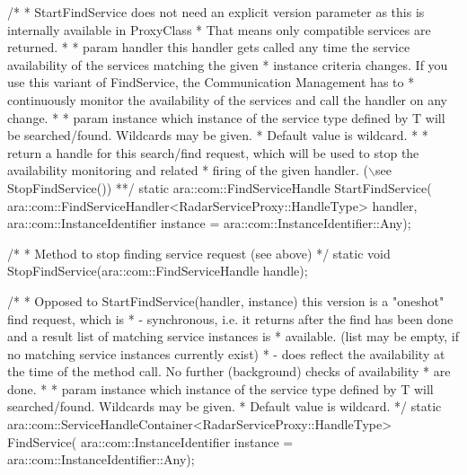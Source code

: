 \begin{DoxyItemize}
\begin{DoxyCode}
  \textcolor{comment}{/*}
\textcolor{comment}{   * StartFindService does not need an explicit version parameter as this}
\textcolor{comment}{     is internally available in ProxyClass}
\textcolor{comment}{   * That means only compatible services are returned.}
\textcolor{comment}{   *}
\textcolor{comment}{   * param handler this handler gets called any time the service}
\textcolor{comment}{     availability of the services matching the given}
\textcolor{comment}{   * instance criteria changes. If you use this variant of FindService,}
\textcolor{comment}{     the Communication Management has to}
\textcolor{comment}{   * continuously monitor the availability of the services and call the}
\textcolor{comment}{     handler on any change.}
\textcolor{comment}{   *}
\textcolor{comment}{   * param instance which instance of the service type defined by T will}
\textcolor{comment}{     be searched/found. Wildcards may be given.}
\textcolor{comment}{   * Default value is wildcard.}
\textcolor{comment}{   *}
\textcolor{comment}{   * return a handle for this search/find request, which will be used to }
\textcolor{comment}{     stop the availability monitoring and related}
\textcolor{comment}{   * firing of the given handler. (\(\backslash\)see StopFindService())}
\textcolor{comment}{   **/}
  \textcolor{keyword}{static} ara::com::FindServiceHandle StartFindService(
  ara::com::FindServiceHandler<RadarServiceProxy::HandleType> handler,
  ara::com::InstanceIdentifier instance =
  ara::com::InstanceIdentifier::Any);

  \textcolor{comment}{/*}
\textcolor{comment}{   * Method to stop finding service request (see above)}
\textcolor{comment}{   */}
  \textcolor{keyword}{static} \textcolor{keywordtype}{void} StopFindService(ara::com::FindServiceHandle handle);

  \textcolor{comment}{/*}
\textcolor{comment}{   * Opposed to StartFindService(handler, instance) this version is a "oneshot"}
\textcolor{comment}{     find request, which is}
\textcolor{comment}{   * - synchronous, i.e. it returns after the find has been done and a}
\textcolor{comment}{    result list of matching service instances is}
\textcolor{comment}{   * available. (list may be empty, if no matching service instances }
\textcolor{comment}{     currently exist)}
\textcolor{comment}{   * - does reflect the availability at the time of the method call. No}
\textcolor{comment}{    further (background) checks of availability}
\textcolor{comment}{   * are done.}
\textcolor{comment}{   *}
\textcolor{comment}{   * param instance which instance of the service type defined by T will}
\textcolor{comment}{     searched/found. Wildcards may be given.}
\textcolor{comment}{   * Default value is wildcard.}
\textcolor{comment}{   */}
  \textcolor{keyword}{static} ara::com::ServiceHandleContainer<RadarServiceProxy::HandleType>
  FindService(
  ara::com::InstanceIdentifier instance =
  ara::com::InstanceIdentifier::Any);


\end{DoxyCode}
\end{DoxyItemize}
